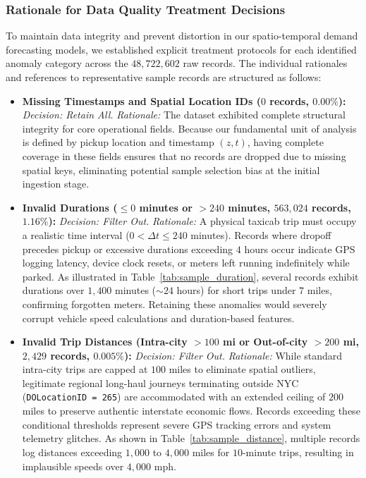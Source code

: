 \documentclass[11pt,a4paper]{article}
\begin{document}
\subsubsection{Rationale for Data Quality Treatment Decisions}
To maintain data integrity and prevent distortion in our spatio-temporal demand forecasting models, we established explicit treatment protocols for each identified anomaly category across the $48,722,602$ raw records. The individual rationales and references to representative sample records are structured as follows:

\begin{itemize}
    \item \textbf{Missing Timestamps and Spatial Location IDs ($0$ records, $0.00\%$):} 
    \textit{Decision: Retain All.} 
    \textit{Rationale:} The dataset exhibited complete structural integrity for core operational fields. Because our fundamental unit of analysis is defined by pickup location and timestamp $(z, t)$, having complete coverage in these fields ensures that no records are dropped due to missing spatial keys, eliminating potential sample selection bias at the initial ingestion stage.

    \item \textbf{Invalid Durations ($\le 0$ minutes or $> 240$ minutes, $563,024$ records, $1.16\%$):} 
    \textit{Decision: Filter Out.} 
    \textit{Rationale:} A physical taxicab trip must occupy a realistic time interval ($0 < \Delta t \le 240$ minutes). Records where dropoff precedes pickup or excessive durations exceeding $4$ hours occur indicate GPS logging latency, device clock resets, or meters left running indefinitely while parked. As illustrated in Table~\ref{tab:sample_duration}, several records exhibit durations over $1,400$ minutes ($\sim 24$ hours) for short trips under $7$ miles, confirming forgotten meters. Retaining these anomalies would severely corrupt vehicle speed calculations and duration-based features.
    
    \item \textbf{Invalid Trip Distances (Intra-city $>100$ mi or Out-of-city $>200$ mi, $2,429$ records, $0.005\%$):} 
    \textit{Decision: Filter Out.} 
    \textit{Rationale:} While standard intra-city trips are capped at $100$ miles to eliminate spatial outliers, legitimate regional long-haul journeys terminating outside NYC (\texttt{DOLocationID = 265}) are accommodated with an extended ceiling of $200$ miles to preserve authentic interstate economic flows. Records exceeding these conditional thresholds represent severe GPS tracking errors and system telemetry glitches. As shown in Table~\ref{tab:sample_distance}, multiple records log distances exceeding $1,000$ to $4,000$ miles for $10$-minute trips, resulting in implausible speeds over $4,000$ mph.


\end{itemize}
\end{document}
